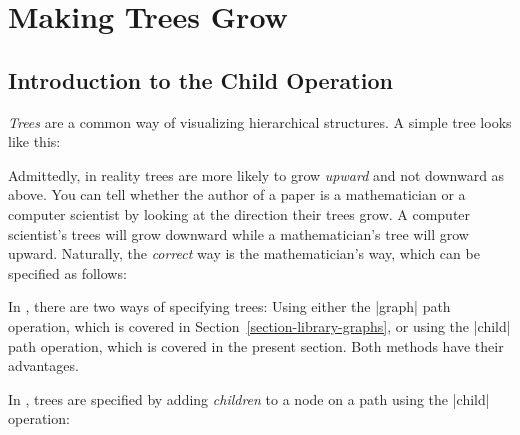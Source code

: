 %
%
%


\section{Making Trees Grow}
\label{section-trees}

\subsection{Introduction to the  Child Operation}

\emph{Trees} are a common way of visualizing hierarchical structures. A simple
tree looks like this:
%
\begin{codeexample}[]
\end{codeexample}

Admittedly, in reality trees are more likely to grow \emph{upward} and not
downward as above. You can tell whether the author of a paper is a
mathematician or a computer scientist by looking at the direction their trees
grow. A computer scientist's trees will grow downward while a mathematician's
tree will grow upward. Naturally, the \emph{correct} way is the mathematician's
way, which can be specified as follows:
%
\begin{codeexample}[]
\end{codeexample}

In \tikzname, there are two ways of specifying trees: Using either the |graph|
path operation, which is covered in Section~\ref{section-library-graphs}, or
using the |child| path operation, which is covered in the present section. Both
methods have their advantages.

In \tikzname, trees are specified by adding \emph{children} to a node on a path
using the |child| operation:

